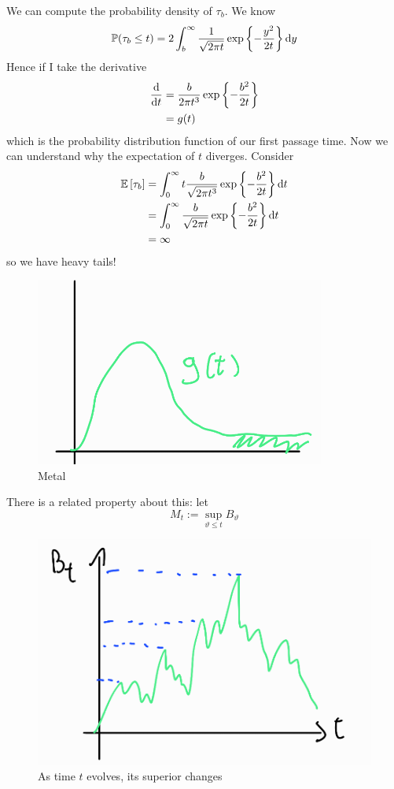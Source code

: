 \documentclass[12pt]{report}
\begin{document}
	We can compute the probability density of $\tau_{b}$. We know
\begin{equation*}
	\mathbb{P}(\tau_{b}\leq t)=2\int_{b}^{\infty}\frac{1}{\sqrt{2\pi t}}\exp\left\{-\frac{y^{2}}{2t}\right\}\mathop{}\!\mathrm{d} y
\end{equation*}
Hence if I take the derivative
\begin{align*}
	\frac{\mathop{}\!\mathrm{d}}{\mathop{}\!\mathrm{d} t}&=\frac{b}{2\pi t^{3}}\exp\left\{-\frac{b^{2}}{2t}\right\}\\
	&=g(t)
\end{align*}
which is the probability distribution function of our first passage time. Now we can understand why the expectation of $t$ diverges. Consider
\begin{align}
	\mathbb{E}\left[\tau_{b}\right]&=\int_{0}^{\infty}t\frac{b}{\sqrt{2\pi t^{3}}}\exp\left\{-\frac{b^{2}}{2t}\right\}\mathop{}\!\mathrm{d} t\nonumber\\
	&=\int_{0}^{\infty}\frac{b}{\sqrt{2\pi t}}\exp\left\{-\frac{b^{2}}{2t}\right\}\mathop{}\!\mathrm{d} t\nonumber\\
	&=\infty\label{hamsa}
\end{align}
so we have heavy tails!
\begin{figure}[H]
	\centering
	\includegraphics[width=0.5\linewidth]{img/screenshot022}
	\caption{Metal}
	\label{fig:screenshot022}
\end{figure}
There is a related property about this: let 
\begin{equation*}
	M_{t}:=\sup_{\vartheta\leq t}B_{\vartheta}
\end{equation*}
\begin{figure}
	\centering
	\includegraphics[width=0.7\linewidth]{img/screenshot023}
	\caption{As time $t$ evolves, its superior changes}
	\label{fig:screenshot023}
\end{figure}
\end{document}
